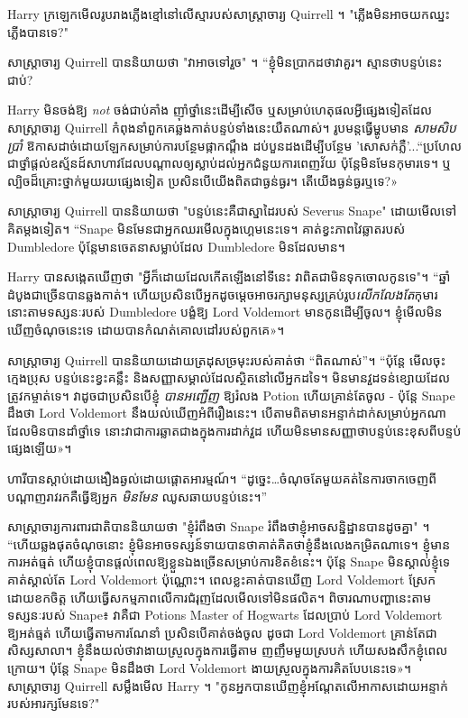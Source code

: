 Harry ក្រឡេកមើលរូបរាងភ្លើងខ្មៅនៅលើស្មារបស់សាស្រ្តាចារ្យ Quirrell ។ "ភ្លើងមិនអាចយកឈ្នះភ្លើងបានទេ?"

សាស្រ្តាចារ្យ Quirrell បាននិយាយថា "វាអាចទៅរួច" ។ “ខ្ញុំ​មិន​ប្រាកដ​ថា​វា​គួរ​។ ស្មានថាបន្ទប់នេះជាប់?

Harry មិនចង់ឱ្យ \emph{not} ចង់ជាប់គាំង ញ៉ាំថ្នាំនេះដើម្បីសើច ឬសម្រាប់ហេតុផលអ្វីផ្សេងទៀតដែលសាស្រ្តាចារ្យ Quirrell កំពុងនាំពួកគេឆ្លងកាត់បន្ទប់ទាំងនេះយឺតណាស់។ រូបមន្តធ្វើម្ហូបមាន \emph{សាមសិបប្រាំ} ឱកាសដាច់ដោយឡែកសម្រាប់ការបន្ថែមផ្កាកណ្ដឹង ដប់បួនដងដើម្បីបន្ថែម 'សោសក់ភ្លឺ'...“ប្រហែលជាថ្នាំផ្តល់ឧស្ម័នដ៍សាហាវដែលបណ្តាលឲ្យស្លាប់ដល់អ្នកជំនួយការពេញវ័យ ប៉ុន្តែមិនមែនកុមារទេ។ ឬល្បិចដ៏គ្រោះថ្នាក់មួយរយផ្សេងទៀត ប្រសិនបើយើងពិតជាធ្ងន់ធ្ងរ។ តើ​យើង​ធ្ងន់ធ្ងរ​ឬ​ទេ?»

សាស្ត្រាចារ្យ Quirrell បាននិយាយថា "បន្ទប់នេះគឺជាស្នាដៃរបស់ Severus Snape" ដោយមើលទៅគិតម្តងទៀត។ “Snape មិន​មែន​ជា​អ្នក​ឈរ​មើល​ក្នុង​ហ្គេម​នេះ​ទេ​។ គាត់ខ្វះភាពវៃឆ្លាតរបស់ Dumbledore ប៉ុន្តែមានចេតនាសម្លាប់ដែល Dumbledore មិនដែលមាន។

Harry បានសង្កេតឃើញថា "អ្វីក៏ដោយដែលកើតឡើងនៅទីនេះ វាពិតជាមិនទុកចោលកូនទេ"។ “ឆ្នាំដំបូងជាច្រើនបានឆ្លងកាត់។ ហើយប្រសិនបើអ្នកដូចម្ដេចអាចរក្សាមនុស្សគ្រប់រូប\emph{លើកលែងតែ}កុមារ នោះតាមទស្សនៈរបស់ Dumbledore បង្ខំឱ្យ Lord Voldemort មានកូនដើម្បីចូល។ ខ្ញុំ​មើល​មិន​ឃើញ​ចំណុច​នេះ​ទេ ដោយ​បាន​កំណត់​គោលដៅ​របស់​ពួកគេ»។

សាស្ត្រាចារ្យ Quirrell បាន​និយាយ​ដោយ​ត្រដុស​ច្រមុះ​របស់​គាត់​ថា “ពិត​ណាស់”។ “ប៉ុន្តែ មើលចុះ ក្មេងប្រុស បន្ទប់នេះខ្វះគន្លឹះ និងសញ្ញាសម្គាល់ដែលស្ថិតនៅលើអ្នកដទៃ។ មិនមានវួដទន់ខ្សោយដែលត្រូវកម្ចាត់ទេ។ វាដូចជាប្រសិនបើខ្ញុំ \emph{បានអញ្ជើញ} ឱ្យរំលង Potion ហើយគ្រាន់តែចូល - ប៉ុន្តែ Snape ដឹងថា Lord Voldemort នឹងយល់ឃើញអំពីរឿងនេះ។ បើ​តាម​ពិត​មាន​អន្ទាក់​ដាក់​សម្រាប់​អ្នក​ណា​ដែល​មិន​បាន​ដាំ​ថ្នាំ​ទេ នោះ​វា​ជា​ការ​ឆ្លាត​ជាង​ក្នុង​ការ​ដាក់​វួដ ហើយ​មិន​មាន​សញ្ញា​ថា​បន្ទប់​នេះ​ខុស​ពី​បន្ទប់​ផ្សេង​ឡើយ»។

ហារីបានស្តាប់ដោយងឿងឆ្ងល់ដោយផ្តោតអារម្មណ៍។ “ដូច្នេះ…ចំណុចតែមួយគត់នៃការចាកចេញពីបណ្តាញរាវរកគឺធ្វើឱ្យអ្នក \emph{មិនមែន} ឈូសឆាយបន្ទប់នេះ។”

សាស្ត្រាចារ្យការពារជាតិបាននិយាយថា "ខ្ញុំរំពឹងថា Snape រំពឹងថាខ្ញុំអាចសន្និដ្ឋានបានដូចគ្នា" ។ “ហើយ​ឆ្លង​ផុត​ចំណុច​នោះ ខ្ញុំ​មិន​អាច​ទស្សន៍ទាយ​បាន​ថា​គាត់​គិត​ថា​ខ្ញុំ​នឹង​លេង​កម្រិត​ណា​ទេ។ ខ្ញុំ​មាន​ការ​អត់​ធ្មត់ ហើយ​ខ្ញុំ​បាន​ផ្តល់​ពេល​ឱ្យ​ខ្លួន​ឯង​ច្រើន​សម្រាប់​ការ​ខិត​ខំ​នេះ។ ប៉ុន្តែ Snape មិនស្គាល់ខ្ញុំទេ គាត់ស្គាល់តែ Lord Voldemort ប៉ុណ្ណោះ។ ពេលខ្លះគាត់បានឃើញ Lord Voldemort ស្រែកដោយខកចិត្ត ហើយធ្វើសកម្មភាពលើការជំរុញដែលមើលទៅមិនផលិត។ ពិចារណាបញ្ហានេះតាមទស្សនៈរបស់ Snape៖ វាគឺជា Potions Master of Hogwarts ដែលប្រាប់ Lord Voldemort ឱ្យអត់ធ្មត់ ហើយធ្វើតាមការណែនាំ ប្រសិនបើគាត់ចង់ចូល ដូចជា Lord Voldemort គ្រាន់តែជាសិស្សសាលា។ ខ្ញុំ​នឹង​យល់​ថា​វា​ងាយ​ស្រួល​ក្នុង​ការ​ធ្វើ​តាម ញញឹម​មួយ​ស្របក់ ហើយ​សងសឹក​ខ្ញុំ​ពេល​ក្រោយ។ ប៉ុន្តែ Snape មិន​ដឹង​ថា Lord Voldemort ងាយ​ស្រួល​ក្នុង​ការ​គិត​បែប​នេះ​ទេ»។ សាស្ត្រាចារ្យ Quirrell សម្លឹងមើល Harry ។ "កូនអ្នកបានឃើញខ្ញុំអណ្តែតលើអាកាសដោយអន្ទាក់របស់អារក្សមែនទេ?"


